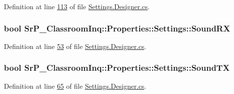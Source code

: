\-Definition at line \hyperlink{_settings_8_designer_8cs_source_l00113}{113} of file \hyperlink{_settings_8_designer_8cs_source}{\-Settings.\-Designer.\-cs}.

\hypertarget{class_sr_p___classroom_inq_1_1_properties_1_1_settings_ab0ec9af30232e0f23083548e3b7242a2}{
\subsubsection[{\-Sound\-R\-X}]{\setlength{\rightskip}{0pt plus 5cm}bool \-Sr\-P\-\_\-\-Classroom\-Inq\-::\-Properties\-::\-Settings\-::\-Sound\-R\-X}}
\label{class_sr_p___classroom_inq_1_1_properties_1_1_settings_ab0ec9af30232e0f23083548e3b7242a2}


\-Definition at line \hyperlink{_settings_8_designer_8cs_source_l00053}{53} of file \hyperlink{_settings_8_designer_8cs_source}{\-Settings.\-Designer.\-cs}.

\hypertarget{class_sr_p___classroom_inq_1_1_properties_1_1_settings_a0baa5402bcfc0c013d2c43fd95adc7e2}{
\subsubsection[{\-Sound\-T\-X}]{\setlength{\rightskip}{0pt plus 5cm}bool \-Sr\-P\-\_\-\-Classroom\-Inq\-::\-Properties\-::\-Settings\-::\-Sound\-T\-X}}
\label{class_sr_p___classroom_inq_1_1_properties_1_1_settings_a0baa5402bcfc0c013d2c43fd95adc7e2}


\-Definition at line \hyperlink{_settings_8_designer_8cs_source_l00065}{65} of file \hyperlink{_settings_8_designer_8cs_source}{\-Settings.\-Designer.\-cs}.


